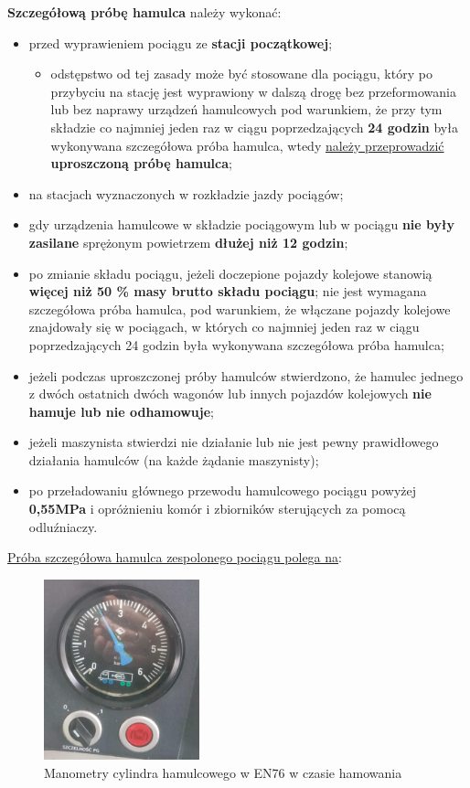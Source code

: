\textbf{Szczegółową próbę hamulca} należy wykonać: 
\begin{itemize}
	\item przed wyprawieniem pociągu ze \textbf{stacji początkowej}; 
	
	\begin{itemize}
		\item odstępstwo od tej zasady może być stosowane dla pociągu, który po przybyciu na stację jest wyprawiony w dalszą
		drogę bez przeformowania lub bez naprawy urządzeń hamulcowych pod warunkiem, że przy tym składzie co najmniej jeden raz
		w ciągu poprzedzających \textbf{24 godzin} była wykonywana szczegółowa próba hamulca, wtedy \underline{należy przeprowadzić} \textbf{uproszczoną próbę hamulca}; 
	\end{itemize}
	\item na stacjach wyznaczonych w rozkładzie jazdy pociągów;
	\item gdy urządzenia hamulcowe w składzie pociągowym lub w pociągu \textbf{nie były} \textbf{zasilane} sprężonym powietrzem \textbf{dłużej niż 12 godzin}; 
	\item po zmianie składu pociągu, jeżeli doczepione pojazdy kolejowe stanowią \textbf{więcej niż 50 \% masy brutto składu pociągu}; nie jest wymagana szczegółowa próba hamulca, pod warunkiem, że włączane pojazdy kolejowe znajdowały się w pociągach, w których co najmniej jeden raz w ciągu poprzedzających 24 godzin była wykonywana szczegółowa próba hamulca;
	
	\item jeżeli podczas uproszczonej próby hamulców stwierdzono, że hamulec jednego z dwóch ostatnich dwóch wagonów lub innych pojazdów kolejowych \textbf{nie hamuje lub nie odhamowuje}; 
	\item jeżeli maszynista stwierdzi nie działanie lub nie jest pewny prawidłowego działania hamulców (na każde żądanie maszynisty); 
	\item po przeładowaniu głównego przewodu hamulcowego pociągu powyżej \textbf{0,55MPa} i opróżnieniu komór i zbiorników sterujących za pomocą odluźniaczy.
\end{itemize}

\underline{Próba szczegółowa hamulca zespolonego pociągu polega na}: 
\begin{figure}
	\centering
	\includegraphics[width=0.4\textwidth]{skryptkierownik-img/manometry-zahamowane-ep.jpg}
	\caption{Manometry cylindra hamulcowego w EN76 w czasie hamowania}
\end{figure}

